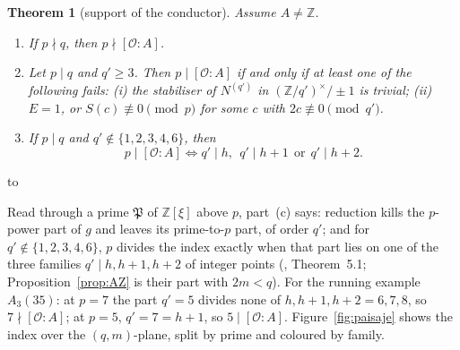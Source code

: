 \documentclass[11pt,a4paper]{article}
\newtheorem{theorem}{Theorem}
\theoremstyle{definition}
\newcommand{\ZZ}{\mathbb{Z}}
\newcommand{\cO}{\mathcal{O}}
\newenvironment{keybox}
  {\par\vspace{9pt}\begin{lrbox}{\fichabox}%
   \begin{minipage}{0.90\textwidth}\vspace{7pt}\setlength{\parskip}{3pt}}
  {\vspace{7pt}\end{minipage}\end{lrbox}%
   \par\needspace{\dimexpr\ht\fichabox+\dp\fichabox+12pt\relax}\noindent\hbox to \textwidth{\hfill
   \textcolor{azul}{\rule[-\dp\fichabox]{3.2pt}{\dimexpr\ht\fichabox+\dp\fichabox\relax}}%
   \colorbox{fondoficha}{\usebox{\fichabox}}\hfill}%
   \par\vspace{9pt}}
\begin{document}
\begin{keybox}
\begin{theorem}[support of the conductor]\label{thm:sop}
Assume $A\ne\ZZ$.
\begin{enumerate}
\item[(a)] If $p\nmid q$, then $p\nmid[\cO:A]$.
\item[(b)] Let $p\mid q$ and $q'\ge3$. Then $p\mid[\cO:A]$ if and only if at least one of the following fails:
 \emph{(i)} the stabiliser of $N^{(q')}$ in $(\ZZ/q')^\times/\pm1$ is trivial;
 \emph{(ii)} $E=1$, or $S(c)\not\equiv0\pmod p$ for some $c$ with $2c\not\equiv0\pmod{q'}$.
\item[(c)] If $p\mid q$ and $q'\notin\{1,2,3,4,6\}$, then
 \[ p\mid[\cO:A]\iff q'\mid h,\ \ q'\mid h+1\ \ \text{or}\ \ q'\mid h+2 . \]
\end{enumerate}
\end{theorem}
\end{keybox}

\noindent Read through a prime $\mathfrak P$ of $\ZZ[\xi]$ above $p$, part~(c) says: reduction kills the
$p$-power part of $g$ and leaves its prime-to-$p$ part, of order $q'$; and for $q'\notin\{1,2,3,4,6\}$, $p$
divides the index exactly when that part lies on one of the three families $q'\mid h,h+1,h+2$ of integer points
(\cite{Mar26}, Theorem~5.1; Proposition~\ref{prop:AZ} is their part with $2m<q$).
For the running example $A_3(35)$: at $p=7$ the part $q'=5$ divides none of $h,h+1,h+2=6,7,8$, so $7\nmid[\cO:A]$;
at $p=5$, $q'=7=h+1$, so $5\mid[\cO:A]$.
Figure~\ref{fig:paisaje} shows the index over the $(q,m)$-plane, split by prime and coloured by family.
\end{document}
